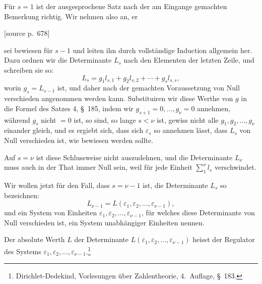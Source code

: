 \documentclass[11pt]{article}
\newcommand{\srcpage}[1]{\par\medskip\noindent\textsf{[source p.~#1]}\par\smallskip}
\begin{document}
Für $s=1$ ist der ausgesprochene Satz nach der am Eingange gemachten Bemerkung richtig. Wir nehmen also an, er
\srcpage{678}
sei bewiesen für $s-1$ und leiten ihn durch vollständige Induction allgemein her. Dazu ordnen wir die Determinante $L_s$ nach den Elementen der letzten Zeile, und schreiben sie so:
\begin{equation}
L_s=g_1l_{s,1}+g_2l_{s,2}+\cdots+g_sl_{s,s},
\tag{2}
\end{equation}
worin $g_s=L_{s-1}$ ist, und daher nach der gemachten Voraussetzung von Null verschieden angenommen werden kann. Substituiren wir diese Werthe von $g$ in die Formel des Satzes 4, \S~185, indem wir $g_{s+1}=0,\ldots,g_\nu=0$ annehmen, während $g_s$ nicht $=0$ ist, so sind, so lange $s<\nu$ ist, gewiss nicht alle $g_1,g_2,\ldots,g_\nu$ einander gleich, und es ergiebt sich, dass sich $\varepsilon_s$ so annehmen lässt, dass $L_s$ von Null verschieden ist, wie bewiesen werden sollte.

Auf $s=\nu$ ist diese Schlussweise nicht auszudehnen, und die Determinante $L_\nu$ muss auch in der That immer Null sein, weil für jede Einheit $\sum_{1}^{\nu} l_s$ verschwindet.

Wir wollen jetzt für den Fall, dass $s=\nu-1$ ist, die Determinante $L_s$ so bezeichnen:
\begin{equation}
L_{\nu-1}=L(\varepsilon_1,\varepsilon_2,\ldots,\varepsilon_{\nu-1}),
\tag{3}
\end{equation}
und ein System von Einheiten $\varepsilon_1,\varepsilon_2,\ldots,\varepsilon_{\nu-1}$, für welches diese Determinante von Null verschieden ist, ein System unabhängiger Einheiten nennen.

Der absolute Werth $L$ der Determinante $L(\varepsilon_1,\varepsilon_2,\ldots,\varepsilon_{\nu-1})$ heisst der Regulator des Systems $\varepsilon_1,\varepsilon_2,\ldots,\varepsilon_{\nu-1}$.\footnote{Dirichlet-Dedekind, Vorlesungen über Zahlentheorie, 4.~Auflage, \S~183.}
\end{document}
